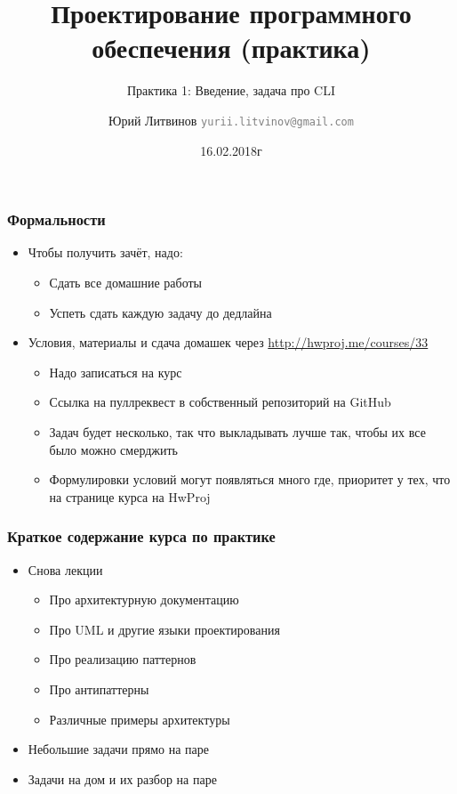 \documentclass[xetex,mathserif,serif]{beamer}
\title{Проектирование программного обеспечения (практика)}
\subtitle{Практика 1: Введение, задача про CLI}
\author[Юрий Литвинов]{Юрий Литвинов \newline \textcolor{gray}{\small\texttt{yurii.litvinov@gmail.com}}}
\date{16.02.2018г}
\begin{document}
	
	\frame{\titlepage}
	
	\begin{frame}
		\frametitle{Формальности}
		\begin{itemize}
			\item Чтобы получить зачёт, надо:
			\begin{itemize}
				\item Сдать все домашние работы
				\item Успеть сдать каждую задачу до дедлайна
			\end{itemize}
			\item Условия, материалы и сдача домашек через \url{http://hwproj.me/courses/33}
			\begin{itemize}
				\item Надо записаться на курс
			\end{itemize}
			\begin{itemize}
				\item Ссылка на пуллреквест в собственный репозиторий на GitHub
				\item Задач будет несколько, так что выкладывать лучше так, чтобы их все было можно смерджить
				\item Формулировки условий могут появляться много где, приоритет у тех, что на странице курса на HwProj
			\end{itemize}
		\end{itemize}
	\end{frame}

	\begin{frame}
		\frametitle{Краткое содержание курса по практике}
		\begin{itemize}
			\item Снова лекции
			\begin{itemize}
				\item Про архитектурную документацию
				\item Про UML и другие языки проектирования
				\item Про реализацию паттернов
				\item Про антипаттерны
				\item Различные примеры архитектуры
			\end{itemize}
			\item Небольшие задачи прямо на паре
			\item Задачи на дом и их разбор на паре
		\end{itemize}
	\end{frame}
	
\end{document}
